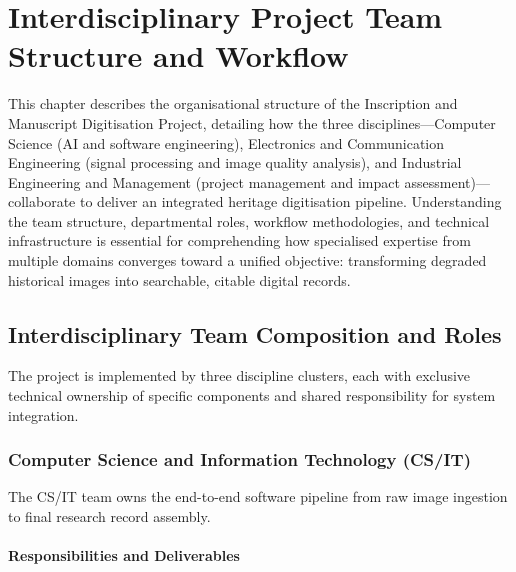 \chapter{Interdisciplinary Project Team Structure and Workflow}

This chapter describes the organisational structure of the Inscription and Manuscript Digitisation Project, detailing how the three disciplines—Computer Science (AI and software engineering), Electronics and Communication Engineering (signal processing and image quality analysis), and Industrial Engineering and Management (project management and impact assessment)—collaborate to deliver an integrated heritage digitisation pipeline. Understanding the team structure, departmental roles, workflow methodologies, and technical infrastructure is essential for comprehending how specialised expertise from multiple domains converges toward a unified objective: transforming degraded historical images into searchable, citable digital records.

\section{Interdisciplinary Team Composition and Roles}

The project is implemented by three discipline clusters, each with exclusive technical ownership of specific components and shared responsibility for system integration.

\subsection{Computer Science and Information Technology (CS/IT)}

The CS/IT team owns the end-to-end software pipeline from raw image ingestion to final research record assembly.

\subsubsection{Responsibilities and Deliverables}

